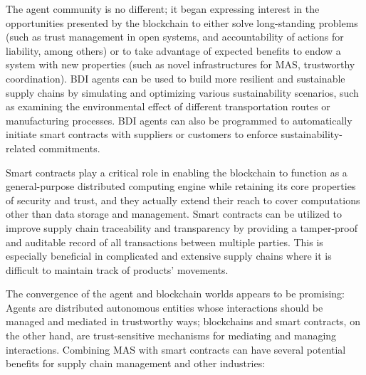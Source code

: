\vspace{.5cm}

The agent community is no different; it began expressing interest in the opportunities presented by the blockchain to either solve long-standing problems (such as trust management in open systems, and accountability of actions for liability, among others) or to take advantage of expected benefits to endow a system with new properties (such as novel infrastructures for \ac{MAS}, trustworthy coordination). \ac{BDI} agents can be used to build more resilient and sustainable supply chains by simulating and optimizing various sustainability scenarios, such as examining the environmental effect of different transportation routes or manufacturing processes. \ac{BDI} agents can also be programmed to automatically initiate smart contracts with suppliers or customers to enforce sustainability-related commitments.

\vspace{.5cm}

Smart contracts play a critical role in enabling the blockchain to function as a general-purpose distributed computing engine while retaining its core properties of security and trust, and they actually extend their reach to cover computations other than data storage and management. Smart contracts can be utilized to improve supply chain traceability and transparency by providing a tamper-proof and auditable record of all transactions between multiple parties. This is especially beneficial in complicated and extensive supply chains where it is difficult to maintain track of products' movements.

\vspace{.5cm}
The convergence of the agent and blockchain worlds appears to be promising: Agents are distributed autonomous entities whose interactions should be managed and mediated in trustworthy ways; blockchains and smart contracts, on the other hand, are trust-sensitive mechanisms for mediating and managing interactions. Combining \ac{MAS} with smart contracts can have several potential benefits for supply chain management and other industries:

